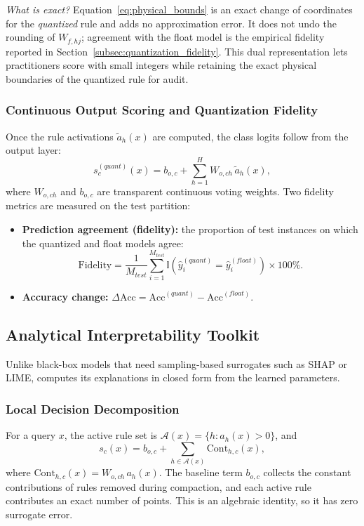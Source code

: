 \noindent\textit{What is exact?} Equation~\eqref{eq:physical_bounds} is an exact
change of coordinates for the \emph{quantized} rule and adds no approximation
error. It does not undo the rounding of $W_{f,hj}$; agreement with the float model
is the empirical fidelity reported in
Section~\ref{subsec:quantization_fidelity}. This dual representation lets
practitioners score with small integers while retaining the exact physical
boundaries of the quantized rule for audit.

\subsubsection{Continuous Output Scoring and Quantization Fidelity}
Once the rule activations $\tilde{a}_h(x)$ are computed, the class logits follow
from the output layer:
\begin{equation}
s_c^{(quant)}(x) = b_{o,c} + \sum_{h=1}^H W_{o,ch} \, \tilde{a}_h(x),
\end{equation}
where $W_{o,ch}$ and $b_{o,c}$ are transparent continuous voting weights. Two
fidelity metrics are measured on the test partition:
\begin{itemize}
    \item \textbf{Prediction agreement (fidelity):} the proportion of test
    instances on which the quantized and float models agree:
    \begin{equation}
    \label{eq:fidelity}
    \text{Fidelity} = \frac{1}{M_{test}} \sum_{i=1}^{M_{test}} \mathbb{I}\left(\hat{y}_i^{(quant)} = \hat{y}_i^{(float)}\right) \times 100\%.
    \end{equation}
    \item \textbf{Accuracy change:}
    $\Delta \text{Acc} = \text{Acc}^{(quant)} - \text{Acc}^{(float)}$.
\end{itemize}

\subsection{Analytical Interpretability Toolkit}
\label{subsec:analytical_xai}

Unlike black-box models that need sampling-based surrogates such as SHAP or LIME,
\modelname{} computes its explanations in closed form from the learned parameters.

\subsubsection{Local Decision Decomposition}
For a query $x$, the active rule set is $\mathcal{A}(x) = \{ h : a_h(x) > 0 \}$, and
\begin{equation}
s_c(x) = b_{o,c} + \sum_{h \in \mathcal{A}(x)} \text{Cont}_{h,c}(x),
\end{equation}
where $\text{Cont}_{h,c}(x) = W_{o,ch} \, a_h(x)$.
The baseline term $b_{o,c}$ collects the constant contributions of rules removed
during compaction, and each active rule contributes an exact number of points.
This is an algebraic identity, so it has zero surrogate error.

